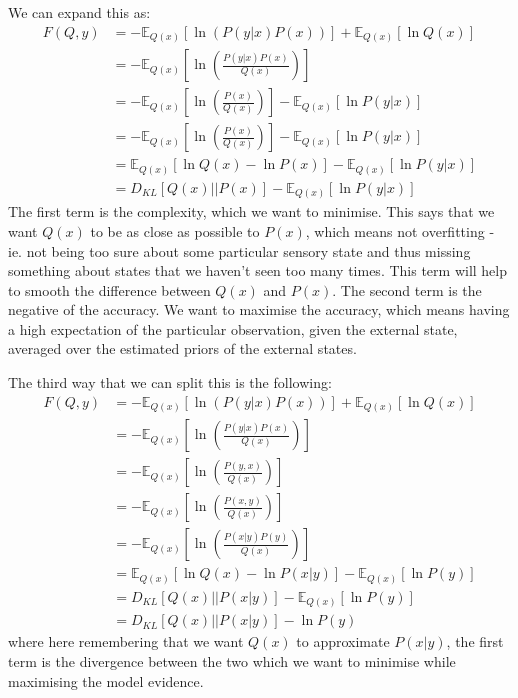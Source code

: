 \documentclass[11pt,oneside]{memoir}
\begin{document}
We can expand this as:
\begin{align}
    F(Q,y)&=-\mathbb{E}_{Q(x)}\left[\ln \left(P(y|x)P(x)\right)\right]+\mathbb{E}_{Q(x)}\left[ \ln Q(x)\right]\\&=-
    \mathbb{E}_{Q(x)}\left[\ln \left(\frac{P(y|x)P(x)}{Q(x)}\right)\right]\\
    &=-
    \mathbb{E}_{Q(x)}\left[\ln \left(\frac{P(x)}{Q(x)}\right)\right]-
    \mathbb{E}_{Q(x)}\left[\ln P(y|x)\right]\\
    &=-
    \mathbb{E}_{Q(x)}\left[\ln \left(\frac{P(x)}{Q(x)}\right)\right]-
    \mathbb{E}_{Q(x)}\left[\ln P(y|x)\right]
    \\
    &=
    \mathbb{E}_{Q(x)}\left[\ln Q(x)-\ln P(x)\right]-
    \mathbb{E}_{Q(x)}\left[\ln P(y|x)\right]
     \\
    &=
    D_{KL}\left[Q(x)|| P(x)\right]-
    \mathbb{E}_{Q(x)}\left[\ln P(y|x)\right]
\end{align}
The first term is the complexity, which we want to minimise. This says that we want $Q(x)$ to be as close as possible to $P(x)$, which means not overfitting - ie. not being too sure about some particular sensory state and thus missing something about states that we haven't seen too many times. This term will help to smooth the difference between $Q(x)$ and $P(x)$. The second term is the negative of the accuracy. We want to maximise the accuracy, which means having a high expectation of the particular observation, given the external state, averaged over the estimated priors of the external states.

The third way that we can split this is the following:
\begin{align}
    F(Q,y)&=-\mathbb{E}_{Q(x)}\left[\ln \left(P(y|x)P(x)\right)\right]+\mathbb{E}_{Q(x)}\left[ \ln Q(x)\right]\\&=-
    \mathbb{E}_{Q(x)}\left[\ln \left(\frac{P(y|x)P(x)}{Q(x)}\right)\right]
    \\&=-
    \mathbb{E}_{Q(x)}\left[\ln \left(\frac{P(y,x)}{Q(x)}\right)\right]
    \\&=-
    \mathbb{E}_{Q(x)}\left[\ln \left(\frac{P(x,y)}{Q(x)}\right)\right]
     \\&=-
    \mathbb{E}_{Q(x)}\left[\ln \left(\frac{P(x|y)P(y)}{Q(x)}\right)\right]
     \\&=
    \mathbb{E}_{Q(x)}\left[\ln Q(x)-\ln P(x|y)\right]-\mathbb{E}_{Q(x)}\left[\ln P(y)\right]
         \\&=
   D_{KL}\left[Q(x)|| P(x|y)\right]-\mathbb{E}_{Q(x)}\left[\ln P(y)\right]
         \\&=
   D_{KL}\left[Q(x)|| P(x|y)\right]-\ln P(y)
\end{align}
where here remembering that we want $Q(x)$ to approximate $P(x|y)$, the first term is the divergence between the two which we want to minimise while maximising the model evidence. 
\end{document}
